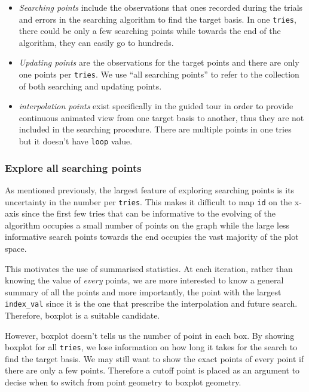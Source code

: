 \documentclass[12pt]{article}
\begin{document}
\begin{itemize}
\item
  \emph{Searching points} include the observations that ones recorded
  during the trials and errors in the searching algorithm to find the
  target basis. In one \texttt{tries}, there could be only a few
  searching points while towards the end of the algorithm, they can
  easily go to hundreds.
\item
  \emph{Updating points} are the observations for the target points and
  there are only one points per \texttt{tries}. We use ``all searching
  points'' to refer to the collection of both searching and updating
  points.
\item
  \emph{interpolation points} exist specifically in the guided tour in
  order to provide continuous animated view from one target basis to
  another, thus they are not included in the searching procedure. There
  are multiple points in one tries but it doesn't have \texttt{loop}
  value.
\end{itemize}

\hypertarget{explore-all-searching-points}{%
\subsubsection{Explore all searching
points}\label{explore-all-searching-points}}

As mentioned previously, the largest feature of exploring searching
points is its uncertainty in the number per \texttt{tries}. This makes
it difficult to map \texttt{id} on the x-axis since the first few tries
that can be informative to the evolving of the algorithm occupies a
small number of points on the graph while the large less informative
search points towards the end occupies the vast majority of the plot
space.

This motivates the use of summarised statistics. At each iteration,
rather than knowing the value of \emph{every} points, we are more
interested to know a general summary of all the points and more
importantly, the point with the largest \texttt{index\_val} since it is
the one that prescribe the interpolation and future search. Therefore,
boxplot is a suitable candidate.

However, boxplot doesn't tells us the number of point in each box. By
showing boxplot for all \texttt{tries}, we lose information on how long
it takes for the search to find the target basis. We may still want to
show the exact points of every point if there are only a few points.
Therefore a cutoff point is placed as an argument to decise when to
switch from point geometry to boxplot geometry.
\end{document}
